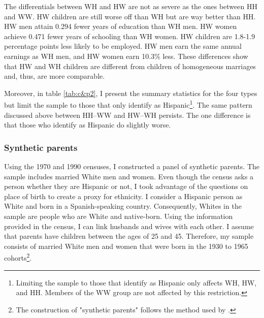 \documentclass[12pt, fullpage]{article}
\begin{document}
The differentials between WH and HW are not as severe as the ones between HH and WW. HW children are still worse off than WH but are way better than HH. HW men attain 0.294 fewer years of education than WH men. HW women achieve 0.471 fewer years of schooling than WH women. HW children are 1.8-1.9 percentage points less likely to be employed. HW men earn the same annual earnings as WH men, and HW women earn 10.3\% less. These differences show that HW and WH children are different from children of homogeneous marriages and, thus, are more comparable.

Moreover, in table \ref{tab:c&p2}, I present the summary statistics for the four types but limit the sample to those that only identify as Hispanic\footnote{Limiting the sample to those that identify as Hispanic only affects WH, HW, and HH. Members of the WW group are not affected by this restriction.}. The same pattern discussed above between HH--WW and HW--WH persists. The one difference is that those who identify as Hispanic do slightly worse.
 
\subsubsection{Synthetic parents}

Using the 1970 and 1990 censuses, I constructed a panel of synthetic parents. The sample includes married White men and women. Even though the census asks a person whether they are Hispanic or not, I took advantage of the questions on place of birth to create a proxy for ethnicity. I consider a Hispanic person as White and born in a Spanish-speaking country. Consequently, Whites in the sample are people who are White and native-born. Using the information provided in the census, I can link husbands and wives with each other. I assume that parents have children between the ages of 25 and 45. Therefore, my sample consists of married White men and women that were born in the 1930 to 1965 cohorts\footnote{The construction of "synthetic parents" follows the method used by \citet{rubinstein2014pride}.}.
\end{document}
